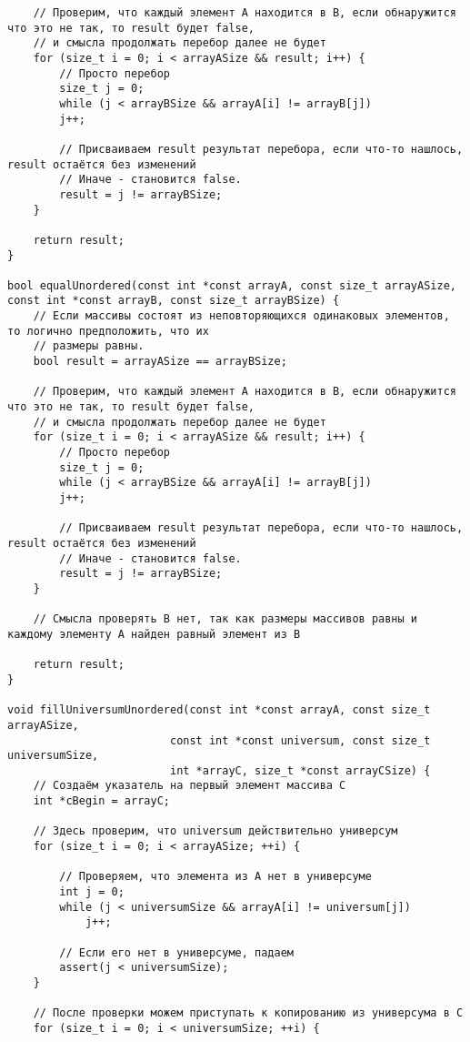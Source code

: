 \documentclass[a4paper,14pt]{extarticle}
\begin{document}
\begin{enumerate}[№1. ]
\begin{enumerate}[label=\asbuk*),ref=\asbuk*]
\begin{verbatim}
	// Проверим, что каждый элемент A находится в B, если обнаружится что это не так, то result будет false,
	// и смысла продолжать перебор далее не будет
	for (size_t i = 0; i < arrayASize && result; i++) {
		// Просто перебор
		size_t j = 0;
		while (j < arrayBSize && arrayA[i] != arrayB[j])
		j++;
		
		// Присваиваем result результат перебора, если что-то нашлось, result остаётся без изменений
		// Иначе - становится false.
		result = j != arrayBSize;
	}
	
	return result;
}

bool equalUnordered(const int *const arrayA, const size_t arrayASize,
const int *const arrayB, const size_t arrayBSize) {
	// Если массивы состоят из неповторяющихся одинаковых элементов, то логично предположить, что их
	// размеры равны.
	bool result = arrayASize == arrayBSize;
	
	// Проверим, что каждый элемент A находится в B, если обнаружится что это не так, то result будет false,
	// и смысла продолжать перебор далее не будет
	for (size_t i = 0; i < arrayASize && result; i++) {
		// Просто перебор
		size_t j = 0;
		while (j < arrayBSize && arrayA[i] != arrayB[j])
		j++;
		
		// Присваиваем result результат перебора, если что-то нашлось, result остаётся без изменений
		// Иначе - становится false.
		result = j != arrayBSize;
	}
	
	// Смысла проверять B нет, так как размеры массивов равны и каждому элементу A найден равный элемент из B
	
	return result;
}

void fillUniversumUnordered(const int *const arrayA, const size_t arrayASize,
                         const int *const universum, const size_t universumSize,
                         int *arrayC, size_t *const arrayCSize) {
    // Создаём указатель на первый элемент массива С
    int *cBegin = arrayC;

    // Здесь проверим, что universum действительно универсум
    for (size_t i = 0; i < arrayASize; ++i) {

        // Проверяем, что элемента из A нет в универсуме
        int j = 0;
        while (j < universumSize && arrayA[i] != universum[j])
            j++;

        // Если его нет в универсуме, падаем
        assert(j < universumSize);
    }

    // После проверки можем приступать к копированию из универсума в C
    for (size_t i = 0; i < universumSize; ++i) {


\end{verbatim}
\end{enumerate}
\end{enumerate}
\end{document}
